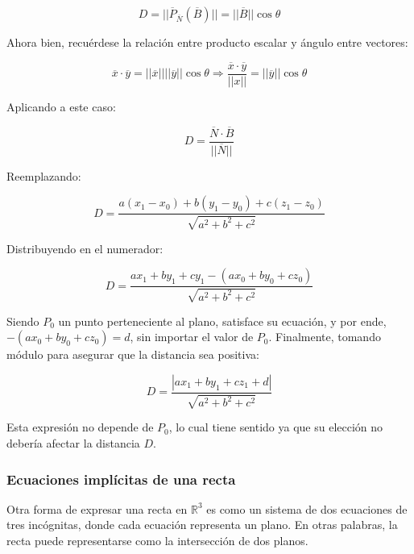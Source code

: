 \documentclass{article}
\renewcommand{\Bbb}{\mathbb}
\begin{document}
\begin{equation}
D = ||\overline{P}_{\overline{N}}(\overline{B})|| = ||\overline{B}|| \cos \theta
\end{equation}

Ahora bien, recuérdese la relación entre producto escalar y ángulo entre vectores:

\begin{equation}
\overline{x} \cdot \overline{y} = ||\overline{x}|| ||\overline{y}|| \cos \theta \Rightarrow  \frac{\overline{x} \cdot \overline{y}}{||x||} = ||\overline{y}|| \cos \theta
\end{equation}

Aplicando a este caso:

\begin{equation}
D = \frac{\overline{N} \cdot \overline{B}}{||\overline{N}||}
\end{equation}

Reemplazando:

\begin{equation}
D = \frac{a (x_1 - x_0) + b (y_1 - y_0) + c (z_1 - z_0)}{\sqrt{a^2 + b^2 + c^2}}
\end{equation}

Distribuyendo en el numerador:

\begin{equation}
D = \frac{a x_1 + b y_1 + c y_1 - (a x_0 + b y_0 + c z_0)}{\sqrt{a^2 + b^2 + c^2}}
\end{equation}

Siendo $P_0$ un punto perteneciente al plano, satisface su ecuación, y por ende, $-(a x_0 + b y_0 + c z_0) = d$, sin importar el valor de $P_0$. Finalmente, tomando módulo para asegurar que la distancia sea positiva:

\begin{equation}
D = \frac{|a x_1 + b y_1 + c z_1 + d|}{\sqrt{a^2 + b^2 + c^2}}
\end{equation}

Esta expresión no depende de $P_0$, lo cual tiene sentido ya que su elección no debería afectar la distancia $D$.

\subsubsection{Ecuaciones implícitas de una recta}

Otra forma de expresar una recta en $\Bbb R^3$ es como un sistema de dos ecuaciones de tres incógnitas, donde cada ecuación representa un plano. En otras palabras, la recta puede representarse como la intersección de dos planos.
\end{document}
